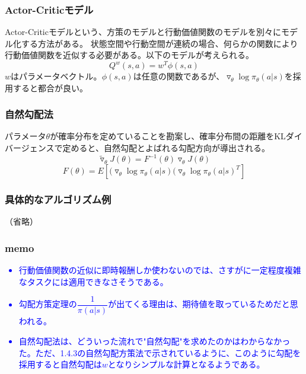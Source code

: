 \documentclass[]{jarticle}
\begin{document}
\subsubsection*{Actor-Criticモデル}
Actor-Criticモデルという、方策のモデルと行動価値関数のモデルを別々にモデル化する方法がある。
状態空間や行動空間が連続の場合、何らかの関数により行動価値関数を近似する必要がある。以下のモデルが考えられる。
\begin{equation*}
Q^w(s, a) = w^T\phi(s,a)
\end{equation*}
$w$はパラメータベクトル。$\phi(s,a)$は任意の関数であるが、$\triangledown_\theta \log \pi_\theta (a|s) $を採用すると都合が良い。 \\

\subsubsection*{自然勾配法}
パラメータ$\theta$が確率分布を定めていることを勘案し、確率分布間の距離をKLダイバージェンスで定めると、自然勾配とよばれる勾配方向が導出される。
\begin{equation*}
\tilde{\triangledown}_\theta J(\theta) = F^{-1}(\theta) \triangledown_\theta J(\theta)
\end{equation*}
\begin{equation*}
F(\theta) = E[(\triangledown_\theta \log \pi_\theta(a|s)(\triangledown_\theta \log \pi_\theta(a|s)^T]
\end{equation*}

\subsubsection*{具体的なアルゴリズム例}
（省略）

\subsubsection*{memo}
\textcolor{blue}{
\begin{itemize}
	\item 行動価値関数の近似に即時報酬しか使わないのでは、さすがに一定程度複雑なタスクには適用できなさそうである。
	\item 勾配方策定理の$\dfrac{1}{\pi(a|s)}$が出てくる理由は、期待値を取っているためだと思われる。
	\item 自然勾配法は、どういった流れで"自然勾配"を求めたのかはわからなかった。ただ、1.4.3の自然勾配方策法で示されているように、このように勾配を採用すると自然勾配は$w$となりシンプルな計算となるようである。
\end{itemize}	
}
\end{document}
